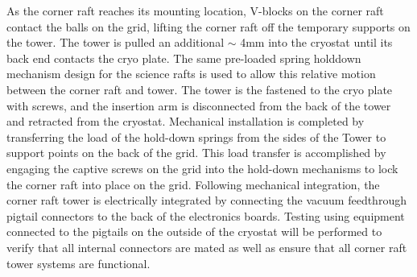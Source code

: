 As the corner raft reaches its mounting location, V-blocks on the corner raft contact the balls on the
grid, lifting the corner raft off the temporary supports on the tower. The tower is pulled an additional
$\sim$ 4mm into the cryostat until its back end contacts the cryo plate. The same pre-loaded spring holddown
mechanism design for the science rafts is used to allow this relative motion between the corner
raft and tower. The tower is the fastened to the cryo plate with screws, and the insertion arm is
disconnected from the back of the tower and retracted from the cryostat.
Mechanical installation is completed by transferring the load of the hold-down springs from the sides of
the Tower to support points on the back of the grid. This load transfer is accomplished by engaging the
captive screws on the grid into the hold-down mechanisms to lock the corner raft into place on the grid.
Following mechanical integration, the corner raft tower is electrically integrated by connecting the
vacuum feedthrough pigtail connectors to the back of the electronics boards. Testing using equipment
connected to the pigtails on the outside of the cryostat will be performed to verify that all internal
connectors are mated as well as ensure that all corner raft tower systems are functional.

